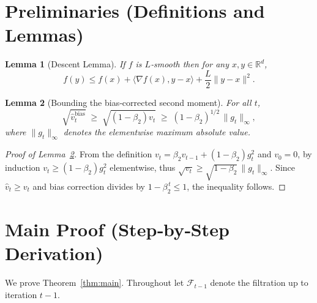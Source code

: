 \documentclass{article}
\newtheorem{lemma}{Lemma}
\begin{document}
\section*{Preliminaries (Definitions and Lemmas)}
\begin{lemma}[Descent Lemma]\label{lem:descent}
If $f$ is $L$‑smooth then for any $x,y\in\mathbb{R}^d$,
\[
f(y)\le f(x)+\langle\nabla f(x),y-x\rangle+\frac{L}{2}\|y-x\|^2 .
\]
\end{lemma}
\begin{lemma}[Bounding the bias‑corrected second moment]\label{lem:vbound}
For all $t$,
\[
\sqrt{\hat v_t^{\text{bias}}}\;\ge\;\sqrt{(1-\beta_2)v_t}\;\ge\;(1-\beta_2)^{1/2}\, \|g_t\|_{\infty},
\]
where $\|g_t\|_{\infty}$ denotes the elementwise maximum absolute value.
\end{lemma}
\begin{proof}[Proof of Lemma~\ref{lem:vbound}]
From the definition $v_t=\beta_2 v_{t-1}+(1-\beta_2)g_t^2$ and $v_0=0$,
by induction $v_t\ge (1-\beta_2)g_t^2$ elementwise, thus $\sqrt{v_t}\ge\sqrt{1-\beta_2}\,\|g_t\|_{\infty}$.
Since $\hat v_t\ge v_t$ and bias correction divides by $1-\beta_2^{\,t}\le1$, the inequality follows. \qedhere
\end{proof}

\section*{Main Proof (Step‑by‑Step Derivation)}
We prove Theorem~\ref{thm:main}. Throughout let $\mathcal{F}_{t-1}$ denote the filtration up to iteration $t-1$.
\end{document}

